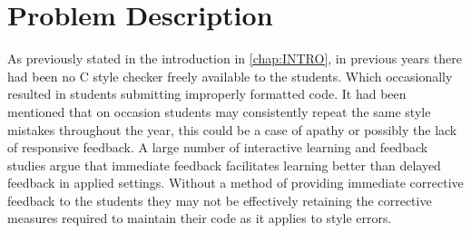 \chapter{Problem Description}
\label{chap:PROBLEM}

As previously stated in the introduction in \autoref{chap:INTRO}, in previous 
years there had been no C style checker freely available to the students. Which 
occasionally resulted in students submitting improperly formatted code.
It had been mentioned that on occasion students may consistently repeat the 
same style mistakes throughout the year, this could be a case of apathy or 
possibly the lack of responsive feedback. A large number of interactive 
learning and feedback studies argue that immediate feedback facilitates 
learning better than delayed feedback in applied settings.\citep{FEEDBACK}
Without a method of providing immediate corrective feedback to the students 
they may not be effectively retaining the corrective measures required to 
maintain their code as it applies to style errors.

